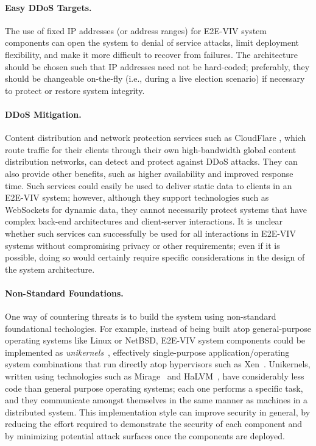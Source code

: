 \paragraph{Easy DDoS Targets.} The use of fixed IP addresses (or
address ranges) for E2E-VIV system components can open the system to
denial of service attacks, limit deployment flexibility, and make it
more difficult to recover from failures. The architecture should be
chosen such that IP addresses need not be hard-coded; preferably, they
should be changeable on-the-fly (i.e., during a live election
scenario) if necessary to protect or restore system integrity.

\paragraph{DDoS Mitigation.} Content distribution and network
protection services such as CloudFlare \cite{CloudFlare}, which route
traffic for their clients through their own high-bandwidth global
content distribution networks, can detect and protect against DDoS
attacks. They can also provide other benefits, such as higher
availability and improved response time. Such services could easily be
used to deliver static data to clients in an E2E-VIV system; however,
although they support technologies such as WebSockets for dynamic
data, they cannot necessarily protect systems that have complex
back-end architectures and client-server interactions. It is unclear
whether such services can successfully be used for all interactions in
E2E-VIV systems without compromising privacy or other requirements;
even if it is possible, doing so would certainly require specific
considerations in the design of the system architecture.

\paragraph{Non-Standard Foundations.} One way of countering threats is
to build the system using non-standard foundational techologies. For
example, instead of being built atop general-purpose operating systems
like Linux or NetBSD, E2E-VIV system components could be implemented as
\emph{unikernels}~\cite{Madhavapeddy13}, effectively single-purpose
application/operating system combinations that run directly atop
hypervisors such as Xen~\cite{Xen}. Unikernels, written using
technologies such as Mirage~\cite{OpenMirage} and HaLVM~\cite{HaLVM},
have considerably less code than general purpose operating systems;
each one performs a specific task, and they communicate amongst
themselves in the same manner as machines in a distributed
system. This implementation style can improve security in general, by
reducing the effort required to demonstrate the security of each
component and by minimizing potential attack surfaces once the
components are deployed. 


